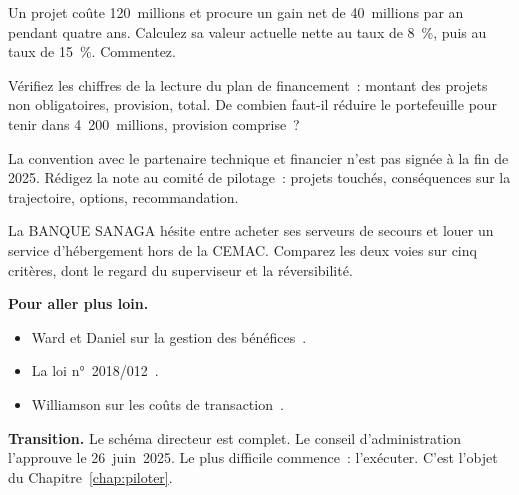 \begin{boxexo}[title={\ding{45}\quad Exercice~12.2. Valeur actuelle nette \niveaumoyen}]
Un projet coûte 120~millions et procure un gain net de 40~millions par an pendant quatre ans. Calculez sa valeur actuelle nette au taux de 8~\%, puis au taux de 15~\%. Commentez.
\end{boxexo}

\begin{boxexo}[title={\ding{45}\quad Exercice~12.3. La provision \niveaumoyen}]
Vérifiez les chiffres de la lecture du plan de financement~: montant des projets non obligatoires, provision, total. De combien faut-il réduire le portefeuille pour tenir dans 4~200~millions, provision comprise~?
\end{boxexo}

\begin{boxexo}[title={\ding{45}\quad Exercice~12.4. Le repli \niveauexpert}]
La convention avec le partenaire technique et financier n'est pas signée à la fin de 2025. Rédigez la note au comité de pilotage~: projets touchés, conséquences sur la trajectoire, options, recommandation.
\end{boxexo}

\begin{boxexo}[title={\ding{45}\quad Exercice~12.5. Louer ou acheter \niveauexpert}]
La BANQUE SANAGA hésite entre acheter ses serveurs de secours et louer un service d'hébergement hors de la CEMAC. Comparez les deux voies sur cinq critères, dont le regard du superviseur et la réversibilité.
\end{boxexo}

\bigskip

\begin{boxinfo}
\textbf{Pour aller plus loin.}
\begin{itemize}
    \item Ward et Daniel sur la gestion des bénéfices~\cite{warddaniel2006}.
    \item La loi n°~2018/012~\cite{loi2018012}.
    \item Williamson sur les coûts de transaction~\cite{williamson1975}.
\end{itemize}
\end{boxinfo}

\begin{boxinfo}
\textbf{Transition.} Le schéma directeur est complet. Le conseil d'administration l'approuve le 26~juin~2025. Le plus difficile commence~: l'exécuter. C'est l'objet du Chapitre~\ref{chap:piloter}.
\end{boxinfo}
